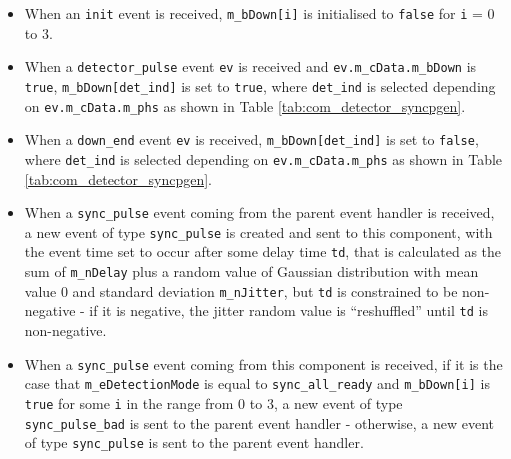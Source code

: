 \begin{itemize}

\item When an \texttt{init} event is received, \texttt{m\_bDown[i]} is initialised to \texttt{false} for \texttt{i} = 0 to 3.

\item When a \texttt{detector\_pulse} event \texttt{ev} is received and \texttt{ev.m\_cData.m\_bDown} is \texttt{true}, \texttt{m\_bDown[det\_ind]} is set to \texttt{true}, where \texttt{det\_ind} is selected depending on \texttt{ev.m\_cData.m\_phs} as shown in Table \ref{tab:com_detector_syncpgen}.

\item When a \texttt{down\_end} event \texttt{ev} is received, \texttt{m\_bDown[det\_ind]} is set to \texttt{false}, where \texttt{det\_ind} is selected depending on \texttt{ev.m\_cData.m\_phs} as shown in Table \ref{tab:com_detector_syncpgen}.

\item When a \texttt{sync\_pulse} event coming from the parent event handler is received, a new event of type \texttt{sync\_pulse} is created and sent to this component, with the event time set to occur after some delay time \texttt{td}, that is calculated as the sum of \texttt{m\_nDelay} plus a random value of Gaussian distribution with mean value 0 and standard deviation \texttt{m\_nJitter}, but \texttt{td} is constrained to be non-negative - if it is negative, the jitter random value is ``reshuffled'' until \texttt{td} is non-negative.

\item When a \texttt{sync\_pulse} event coming from this component is received, if it is the case that \texttt{m\_eDetectionMode} is equal to \texttt{sync\_all\_ready} and \texttt{m\_bDown[i]} is \texttt{true} for some \texttt{i} in the range from 0 to 3, a new event of type \texttt{sync\_pulse\_bad} is sent to the parent event handler - otherwise, a new event of type \texttt{sync\_pulse} is sent to the parent event handler.

\end{itemize}

